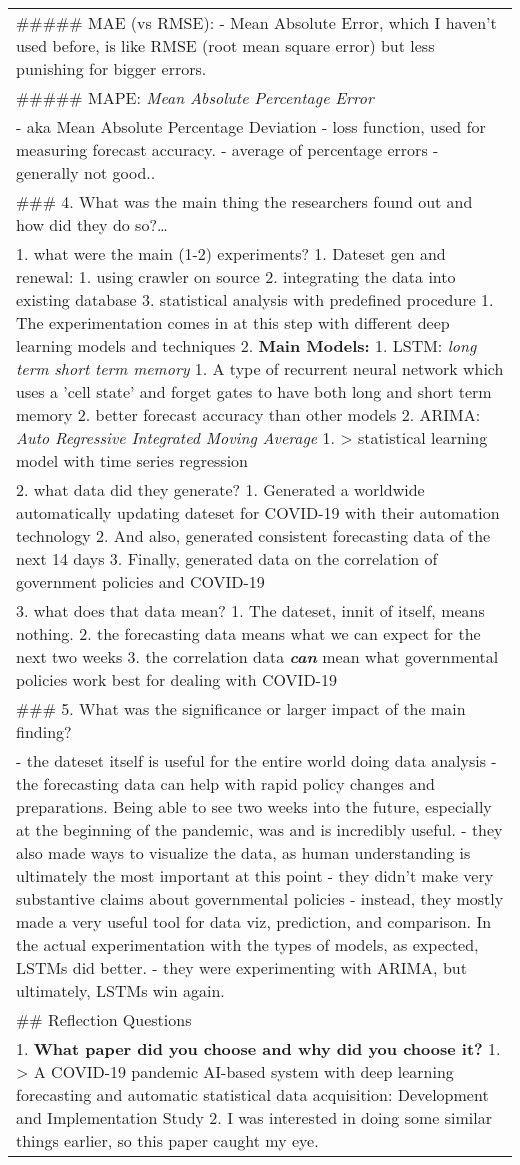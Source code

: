 \documentclass[letterpaper]{article}
\begin{document}
\begin{center}
\begin{tabular}{l}
\#\#\#\#\# MAE (vs RMSE): - Mean Absolute Error, which I haven't used before, is like RMSE (root mean square error) but less punishing for bigger errors.\\
\#\#\#\#\# MAPE: \emph{Mean Absolute Percentage Error}\\
- aka Mean Absolute Percentage Deviation - loss function, used for measuring forecast accuracy. - average of percentage errors - generally not good..\\
\#\#\# 4. What was the main thing the researchers found out and how did they do so?\ldots{}\\
1. what were the main (1-2) experiments? 1. Dateset gen and renewal: 1. using crawler on source 2. integrating the data into existing database 3. statistical analysis with predefined procedure 1. The experimentation comes in at this step with different deep learning models and techniques 2. \textbf{Main Models:} 1. LSTM: \emph{long term short term memory} 1. A type of recurrent neural network which uses a 'cell state' and forget gates to have both long and short term memory 2. better forecast accuracy than other models 2. ARIMA: \emph{Auto Regressive Integrated Moving Average} 1. > statistical learning model with time series regression\\
2. what data did they generate? 1. Generated a worldwide automatically updating dateset for COVID-19 with their automation technology 2. And also, generated consistent forecasting data of the next 14 days 3. Finally, generated data on the correlation of government policies and COVID-19\\
3. what does that data mean? 1. The dateset, innit of itself, means nothing. 2. the forecasting data means what we can expect for the next two weeks 3. the correlation data \textbf{\emph{can}} mean what governmental policies work best for dealing with COVID-19\\
\#\#\# 5. What was the significance or larger impact of the main finding?\\
- the dateset itself is useful for the entire world doing data analysis - the forecasting data can help with rapid policy changes and preparations. Being able to see two weeks into the future, especially at the beginning of the pandemic, was and is incredibly useful. - they also made ways to visualize the data, as human understanding is ultimately the most important at this point - they didn't make very substantive claims about governmental policies - instead, they mostly made a very useful tool for data viz, prediction, and comparison. In the actual experimentation with the types of models, as expected, LSTMs did better. - they were experimenting with ARIMA, but ultimately, LSTMs win again.\\
\#\# Reflection Questions\\
1. \textbf{What paper did you choose and why did you choose it?} 1. > A COVID-19 pandemic AI-based system with deep learning forecasting and automatic statistical data acquisition: Development and Implementation Study 2. I was interested in doing some similar things earlier, so this paper caught my eye.\\
\end{tabular}
\end{center}
\end{document}
